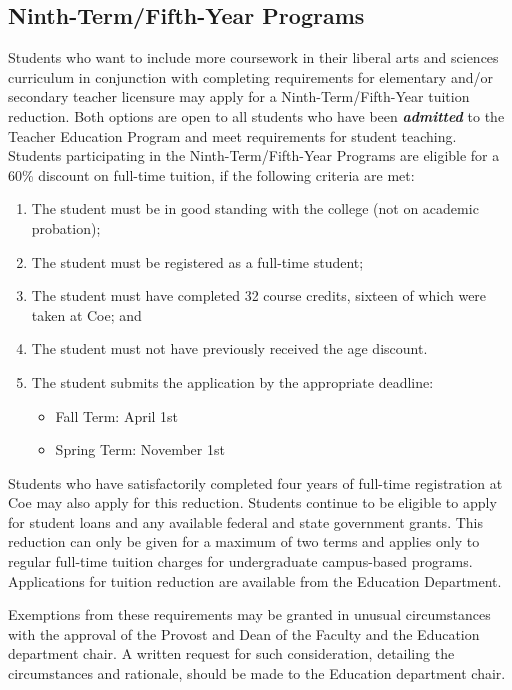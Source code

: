\documentclass[
  letterpaper,
]{scrbook}
\providecommand{\tightlist}{%
  \setlength{\itemsep}{0pt}\setlength{\parskip}{0pt}}
\begin{document}
\subsection{Ninth-Term/Fifth-Year
Programs}\label{ninth-termfifth-year-programs}

Students who want to include more coursework in their liberal arts and
sciences curriculum in conjunction with completing requirements for
elementary and/or secondary teacher licensure may apply for a
Ninth-Term/Fifth-Year tuition reduction. Both options are open to all
students who have been \textbf{\emph{admitted}} to the Teacher Education
Program and meet requirements for student teaching. Students
participating in the Ninth-Term/Fifth-Year Programs are eligible for a
60\% discount on full-time tuition, if the following criteria are met:

\begin{enumerate}
\def\labelenumi{\arabic{enumi}.}
\tightlist
\item
  The student must be in good standing with the college (not on academic
  probation);
\item
  The student must be registered as a full-time student;
\item
  The student must have completed 32 course credits, sixteen of which
  were taken at Coe; and
\item
  The student must not have previously received the age discount.
\item
  The student submits the application by the appropriate deadline:

  \begin{itemize}
  \tightlist
  \item
    Fall Term: April 1st
  \item
    Spring Term: November 1st
  \end{itemize}
\end{enumerate}

Students who have satisfactorily completed four years of full-time
registration at Coe may also apply for this reduction. Students continue
to be eligible to apply for student loans and any available federal and
state government grants. This reduction can only be given for a maximum
of two terms and applies only to regular full-time tuition charges for
undergraduate campus-based programs. Applications for tuition reduction
are available from the Education Department.

Exemptions from these requirements may be granted in unusual
circumstances with the approval of the Provost and Dean of the Faculty
and the Education department chair. A written request for such
consideration, detailing the circumstances and rationale, should be made
to the Education department chair.
\end{document}
